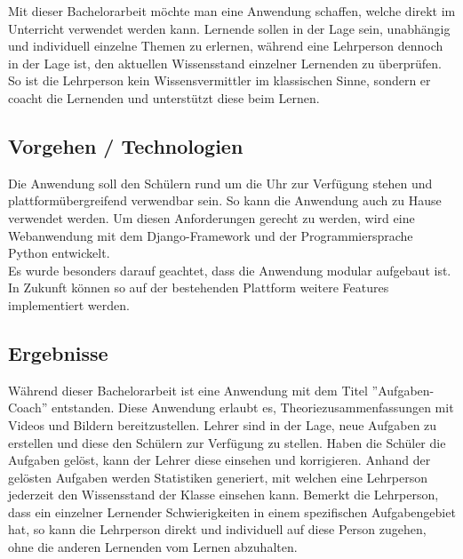\newpage

Mit dieser Bachelorarbeit möchte man eine Anwendung schaffen, welche direkt im Unterricht verwendet werden kann. Lernende sollen in der Lage sein, unabhängig und individuell einzelne Themen zu erlernen, während eine Lehrperson dennoch in der Lage ist, den aktuellen Wissensstand einzelner Lernenden zu überprüfen. So ist die Lehrperson kein Wissensvermittler im klassischen Sinne, sondern er coacht die Lernenden und unterstützt diese beim Lernen.



\subsection{Vorgehen / Technologien}
Die Anwendung soll den Schülern rund um die Uhr zur Verfügung stehen und plattformübergreifend verwendbar sein. So kann die Anwendung auch zu Hause verwendet werden. Um diesen Anforderungen gerecht zu werden, wird eine Webanwendung mit dem Django-Framework und der Programmiersprache Python entwickelt. \\
Es wurde besonders darauf geachtet, dass die Anwendung modular aufgebaut ist. In Zukunft können so auf der bestehenden Plattform weitere Features implementiert werden.

\subsection{Ergebnisse}
Während dieser Bachelorarbeit ist eine Anwendung mit dem Titel ''Aufgaben-Coach'' entstanden. Diese Anwendung erlaubt es, Theoriezusammenfassungen mit Videos und Bildern bereitzustellen. Lehrer sind in der Lage, neue Aufgaben zu erstellen und diese den Schülern zur Verfügung zu stellen. Haben die Schüler die Aufgaben gelöst, kann der Lehrer diese einsehen und korrigieren. Anhand der gelösten Aufgaben werden Statistiken generiert, mit welchen eine Lehrperson jederzeit den Wissensstand der Klasse einsehen kann. Bemerkt die Lehrperson, dass ein einzelner Lernender Schwierigkeiten in einem spezifischen Aufgabengebiet hat, so kann die Lehrperson direkt und individuell auf diese Person zugehen, ohne die anderen Lernenden vom Lernen abzuhalten.

